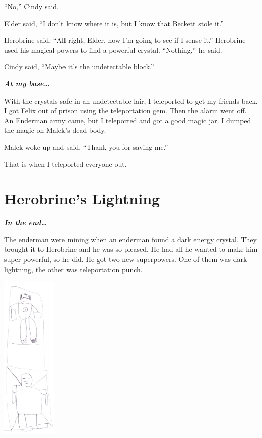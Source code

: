 \documentclass[12pt,twoside]{krantz}
\begin{document}
``No,'' Cindy said.

Elder said, ``I don't know where it is, but I know that Beckett stole
it.''

Herobrine said, ``All right, Elder, now I'm going to see if I sense
it.'' Herobrine used his magical powers to find a powerful crystal.
``Nothing,'' he said.

Cindy said, ``Maybe it's the undetectable block.''

\textbf{\emph{At my base\ldots{}}}

With the crystals safe in an undetectable lair, I teleported to get my
friends back. I got Felix out of prison using the teleportation gem.
Then the alarm went off. An Enderman army came, but I teleported and got
a good magic jar. I dumped the magic on Malek's dead body.

Malek woke up and said, ``Thank you for saving me.''

That is when I teleported everyone out.

\hypertarget{herobrines-lightning}{%
\section{Herobrine's Lightning}\label{herobrines-lightning}}

\textbf{\emph{In the end\ldots{}}}

The enderman were mining when an enderman found a dark energy crystal.
They brought it to Herobrine and he was so pleased. He had all he wanted
to make him super powerful, so he did. He got two new superpowers. One
of them was dark lightning, the other was teleportation punch.

\includegraphics[width=1.04167in,height=\textheight]{img/final-war/dark-lightning.jpg}
\end{document}
